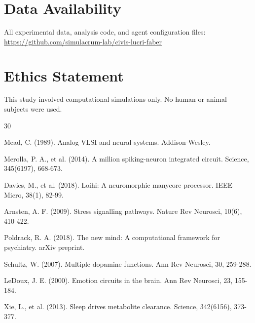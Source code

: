 \documentclass[10pt,a4paper]{article}
\begin{document}
\section*{Data Availability}

All experimental data, analysis code, and agent configuration files: \url{https://github.com/simulacrum-lab/civis-lucri-faber}

\section*{Ethics Statement}

This study involved computational simulations only. No human or animal subjects were used.

\begin{thebibliography}{30}

 Mead, C. (1989). Analog VLSI and neural systems. Addison-Wesley.

 Merolla, P. A., et al. (2014). A million spiking-neuron integrated circuit. Science, 345(6197), 668-673.

 Davies, M., et al. (2018). Loihi: A neuromorphic manycore processor. IEEE Micro, 38(1), 82-99.

 Arnsten, A. F. (2009). Stress signalling pathways. Nature Rev Neurosci, 10(6), 410-422.

 Poldrack, R. A. (2018). The new mind: A computational framework for psychiatry. arXiv preprint.

 Schultz, W. (2007). Multiple dopamine functions. Ann Rev Neurosci, 30, 259-288.

 LeDoux, J. E. (2000). Emotion circuits in the brain. Ann Rev Neurosci, 23, 155-184.

 Xie, L., et al. (2013). Sleep drives metabolite clearance. Science, 342(6156), 373-377.

\end{thebibliography}
\end{document}
